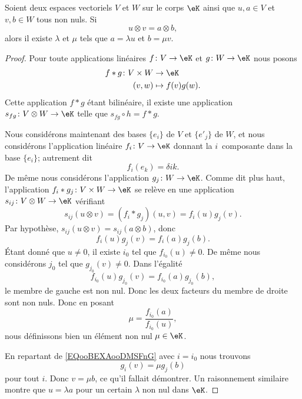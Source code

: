 \begin{proposition}
	Soient deux espaces vectoriels \( V\) et \( W\) sur le corps \( \eK\) ainsi que \( u,a\in V\) et \( v,b\in W\) tous non nuls. Si
	\begin{equation}
		u\otimes v=a\otimes b,
	\end{equation}
	alors il existe \( \lambda\) et \( \mu\) tels que \( a=\lambda u\) et \( b=\mu v\).
\end{proposition}

\begin{proof}
	Pour toute applications linéaires \(f \colon V\to \eK  \) et \(g \colon W\to \eK  \) nous posons
	\begin{equation}
		\begin{aligned}
			f*g\colon V\times W & \to \eK           \\
			(v,w)               & \mapsto f(v)g(w).
		\end{aligned}
	\end{equation}
	Cette application \( f*g\) étant bilinéaire, il existe une application \(s_{fg} \colon V\otimes W\to \eK  \) telle que \( s_{fg}\circ h=f*g\).

	Nous considérons maintenant des bases \( \{ e_i \}\) de \( V\) et \( \{ e'_j \}\) de \( W\), et nous considérons l'application linéaire \(f_i \colon V\to \eK  \) donnant la \( i\)\ieme\ composante dans la base \( \{ e_i \}\); autrement dit
	\begin{equation}
		f_i(e_k)=\delta{ik}.
	\end{equation}
	De même nous considérons l'application \(g_j \colon W\to \eK  \). Comme dit plus haut, l'application \(f_i*g_j \colon V\times W\to \eK  \) se relève en une application \(s_{ij} \colon V\otimes W\to \eK  \) vérifiant
	\begin{equation}
		s_{ij}(u\otimes v)=(f_i*g_j)(u,v)=f_i(u)g_j(v).
	\end{equation}
	Par hypothèse, \( s_{ij}(u\otimes v)=s_{ij}(a\otimes b)\), donc
	\begin{equation}		\label{EQooBEXAooDMSFnG}
		f_i(u)g_j(v)=f_i(a)g_j(b).
	\end{equation}
	Étant donné que \( u\neq 0\), il existe \( i_0\) tel que \( f_{i_0}(u)\neq 0\). De même nous considérons \( j_0\) tel que \( g_{j_0}(v)\neq 0\). Dans l'égalité
	\begin{equation}
		f_{i_0}(u)g_{j_0}(v)=f_{i_0}(a)g_{j_0}(b),
	\end{equation}
	le membre de gauche est non nul. Donc les deux facteurs du membre de droite sont non nuls. Donc en posant
	\begin{equation}
		\mu=\frac{ f_{i_0}(a) }{ f_{i_0}(u) },
	\end{equation}
	nous définissons bien un élément non nul \( \mu\in \eK\).

	En repartant de \eqref{EQooBEXAooDMSFnG} avec \( i=i_0\) nous trouvons
	\begin{equation}
		g_i(v)=\mu g_j(b)
	\end{equation}
	pour tout \( i\). Donc \( v=\mu b\), ce qu'il fallait démontrer. Un raisonnement similaire montre que \( u=\lambda a\) pour un certain \( \lambda\) non nul dans  \(\eK\).
\end{proof}

